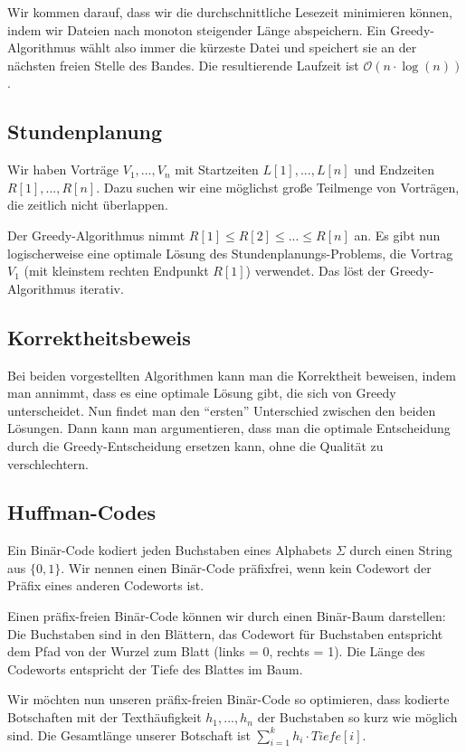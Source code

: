\documentclass[12pt]{article}
\begin{document}
Wir kommen darauf, dass wir die durchschnittliche Lesezeit minimieren können, indem wir Dateien nach monoton steigender Länge abspeichern. Ein Greedy-Algorithmus wählt also immer die kürzeste Datei und speichert sie an der nächsten freien Stelle des Bandes. Die resultierende Laufzeit ist $\mathcal O(n \cdot \log(n))$.

\subsection{Stundenplanung}
Wir haben Vorträge $V_1, ..., V_n$ mit Startzeiten $L[1], ..., L[n]$ und Endzeiten $R[1], ..., R[n]$. Dazu suchen wir eine möglichst große Teilmenge von Vorträgen, die zeitlich nicht überlappen.

Der Greedy-Algorithmus nimmt $R[1] \leq R[2] \leq ... \leq R[n]$ an. Es gibt nun logischerweise eine optimale Lösung des Stundenplanungs-Problems, die Vortrag $V_1$ (mit kleinstem rechten Endpunkt $R[1]$) verwendet. Das löst der Greedy-Algorithmus iterativ.

\subsection{Korrektheitsbeweis}
Bei beiden vorgestellten Algorithmen kann man die Korrektheit beweisen, indem man annimmt, dass es eine optimale Lösung gibt, die sich von Greedy unterscheidet. Nun findet man den \enquote{ersten} Unterschied zwischen den beiden Lösungen. Dann kann man argumentieren, dass man die optimale Entscheidung durch die Greedy-Entscheidung ersetzen kann, ohne die Qualität zu verschlechtern.

\subsection{Huffman-Codes}
Ein Binär-Code kodiert jeden Buchstaben eines Alphabets $\Sigma$ durch einen String aus $\{0,1\}$. Wir nennen einen Binär-Code präfixfrei, wenn kein Codewort der Präfix eines anderen Codeworts ist.

Einen präfix-freien Binär-Code können wir durch einen Binär-Baum darstellen: Die Buchstaben sind in den Blättern, das Codewort für Buchstaben entspricht dem Pfad von der Wurzel zum Blatt (links = 0, rechts = 1). Die Länge des Codeworts entspricht der Tiefe des Blattes im Baum.

Wir möchten nun unseren präfix-freien Binär-Code so optimieren, dass kodierte Botschaften mit der Texthäufigkeit $h_1, ..., h_n$ der Buchstaben so kurz wie möglich sind. Die Gesamtlänge unserer Botschaft ist $\sum_{i=1}^k h_i \cdot Tiefe[i]$.
\end{document}
